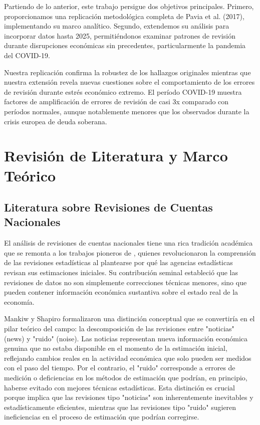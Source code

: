 \documentclass{article}
\begin{document}
Partiendo de lo anterior, este trabajo persigue dos objetivos principales. Primero, proporcionamos una replicación metodológica completa de Pavia et al. (2017), implementando su marco analítico. Segundo, extendemos su análisis para incorporar datos hasta 2025, permitiéndonos examinar patrones de revisión durante disrupciones económicas sin precedentes, particularmente la pandemia del COVID-19.

Nuestra replicación confirma la robustez de los hallazgos originales mientras que nuestra extensión revela nuevas cuestiones sobre el comportamiento de los errores de revisión durante estrés económico extremo. El período COVID-19 muestra factores de amplificación de errores de revisión de casi 3x comparado con períodos normales, aunque notablemente menores que los observados durante la crisis europea de deuda soberana.

\section{Revisión de Literatura y Marco Teórico}

\subsection{Literatura sobre Revisiones de Cuentas Nacionales}

El análisis de revisiones de cuentas nacionales tiene una rica tradición académica que se remonta a los trabajos pioneros de \citet{mankiw1986}, quienes revolucionaron la comprensión de las revisiones estadísticas al plantearse por qué las agencias estadísticas revisan sus estimaciones iniciales. Su contribución seminal estableció que las revisiones de datos no son simplemente correcciones técnicas menores, sino que pueden contener información económica sustantiva sobre el estado real de la economía. 

Mankiw y Shapiro formalizaron una distinción conceptual que se convertiría en el pilar teórico del campo: la descomposición de las revisiones entre "noticias" (news) y "ruido" (noise). Las noticias representan nueva información económica genuina que no estaba disponible en el momento de la estimación inicial, reflejando cambios reales en la actividad económica que solo pueden ser medidos con el paso del tiempo. Por el contrario, el "ruido" corresponde a errores de medición o deficiencias en los métodos de estimación que podrían, en principio, haberse evitado con mejores técnicas estadísticas. Esta distinción es crucial porque implica que las revisiones tipo "noticias" son inherentemente inevitables y estadísticamente eficientes, mientras que las revisiones tipo "ruido" sugieren ineficiencias en el proceso de estimación que podrían corregirse.
\end{document}
